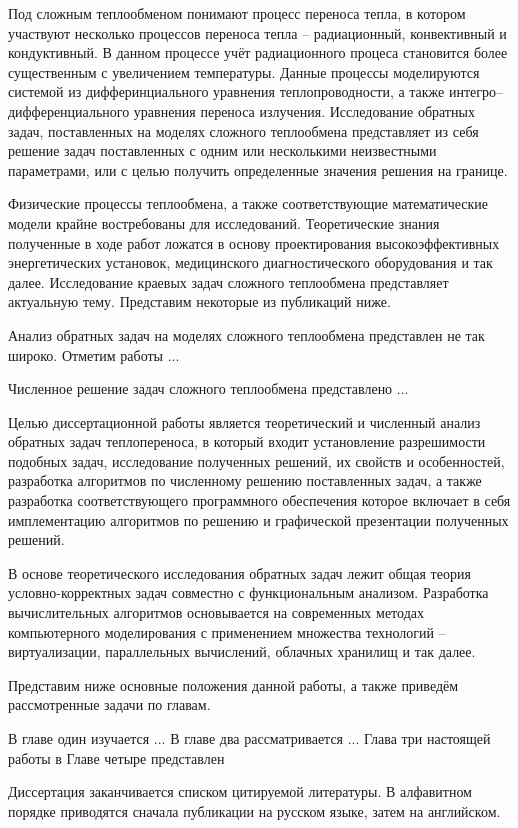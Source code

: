 \documentclass[11pt]{article}
\begin{document}
    Под сложным теплообменом понимают процесс переноса тепла, в котором участвуют
    несколько процессов переноса тепла -- радиационный, конвективный и кондуктивный.
    В данном процессе учёт радиационного процеса становится более существенным с
    увеличением температуры.
    Данные процессы моделируются системой из дифферинциального уравнения теплопроводности,
    а также интегро--дифференциального уравнения переноса излучения.
    Исследование обратных задач, поставленных на моделях сложного теплообмена представляет из себя
    решение задач поставленных с одним или несколькими неизвестными параметрами, или с целью получить
    определенные значения решения на границе.

    Физические процессы теплообмена, а также соответствующие математические
    модели крайне востребованы для исследований.
    Теоретические знания полученные в ходе работ ложатся в основу проектирования высокоэффективных энергетических
    установок, медицинского диагностического оборудования и так далее.
    Исследование краевых задач сложного теплообмена представляет актуальную тему.
    Представим некоторые из публикаций ниже.


    Анализ обратных задач на моделях сложного теплообмена представлен не так широко.
    Отметим работы ...

    Численное решение задач сложного теплообмена представлено ...


    Целью диссертационной работы является теоретический и численный анализ обратных задач теплопереноса,
    в который входит установление разрешимости подобных задач, исследование полученных решений, их свойств
    и особенностей, разработка алгоритмов по численному решению поставленных задач, а также
    разработка соответствующего программного обеспечения которое включает в себя имплементацию алгоритмов по решению и
    графической презентации полученных решений.

    В основе теоретического исследования обратных задач лежит общая теория условно-корректных задач совместно
    с функциональным анализом.
    Разработка вычислительных алгоритмов основывается на современных методах компьютерного моделирования с применением
    множества технологий -- виртуализации, параллельных вычислений, облачных хранилищ и так далее.

    Представим ниже основные положения данной работы, а также приведём рассмотренные задачи по главам.

    В главе один изучается ...
    В главе два рассматривается ...
    Глава три настоящей работы
    в Главе четыре представлен

    Диссертация заканчивается списком цитируемой литературы.
    В алфавитном порядке приводятся сначала публикации на русском языке, затем на английском.
\end{document}
